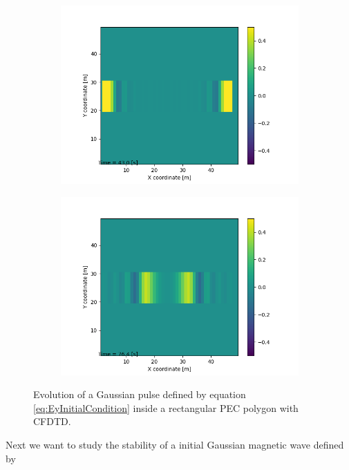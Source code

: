 \documentclass[12pt, oneside]{book}
\begin{document}
\begin{figure}[h!]
    \begin{subfigure}[b]{0.49\textwidth}
        \centering
        \includegraphics[width=\textwidth]{Imagenes/CFDTD2D_GaussianY3.png}
    \end{subfigure}
    \begin{subfigure}[b]{0.49\textwidth}
        \centering
        \includegraphics[width=\textwidth]{Imagenes/CFDTD2D_GaussianY4.png}
    \end{subfigure}
    \caption{Evolution of a Gaussian pulse defined by equation \ref{eq:EyInitialCondition} inside a rectangular PEC polygon with CFDTD.}
    \label{fig:CFDTD2D_GaussianEy}
\end{figure}
\newpage
Next we want to study the stability of a initial Gaussian magnetic wave defined by 
\end{document}
